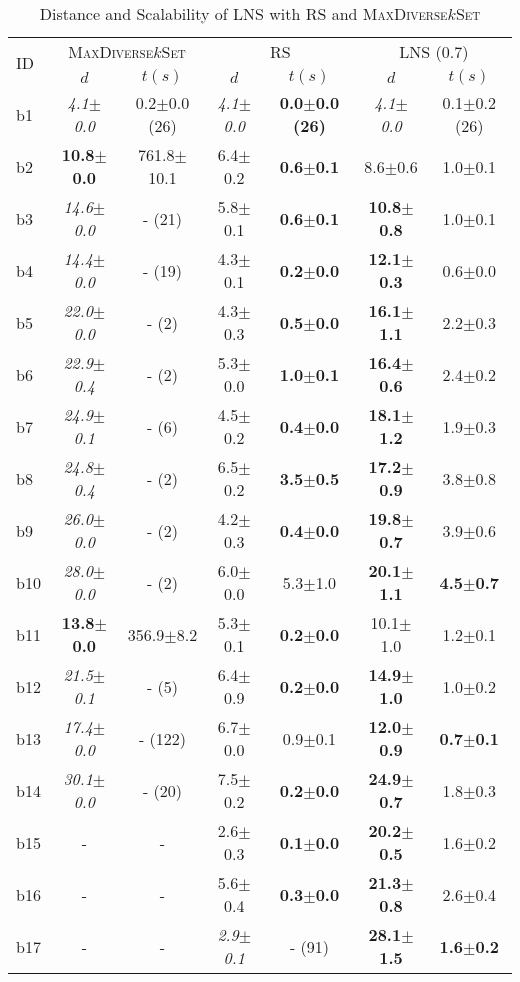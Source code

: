 \begin{longtable}{|l|c|c|c|c|c|c|}
\caption{\label{tab:dist_max_rs_lns} Distance and Scalability of \ac{LNS} with \ac{RS} and \textsc{MaxDiverse$k$Set}}\\
\hline
\multirow{2}{*}{ID}&\multicolumn{2}{c|}{\textsc{MaxDiverse$k$Set}}&\multicolumn{2}{c|}{{RS}}&\multicolumn{2}{c|}{LNS (0.7)}\\
\cline{2-7}
&$d$&$t(s)$&$d$&$t(s)$&$d$&$t(s)$\\
\hline
b1&\textit{4.1$\pm$0.0} & 0.2$\pm$0.0 (26)&\textit{4.1$\pm$0.0} & \textbf{0.0$\pm$0.0 (26)}&\textit{4.1$\pm$0.0} & 0.1$\pm$0.2 (26)
\\
b2&\textbf{10.8$\pm$0.0} & 761.8$\pm$10.1&6.4$\pm$0.2 & \textbf{0.6$\pm$0.1}&8.6$\pm$0.6 & 1.0$\pm$0.1
\\
b3&\textit{14.6$\pm$0.0} & - (21)&5.8$\pm$0.1 & \textbf{0.6$\pm$0.1}&\textbf{10.8$\pm$0.8} & 1.0$\pm$0.1
\\
b4&\textit{14.4$\pm$0.0} & - (19)&4.3$\pm$0.1 & \textbf{0.2$\pm$0.0}&\textbf{12.1$\pm$0.3} & 0.6$\pm$0.0
\\
b5&\textit{22.0$\pm$0.0} & - (2)&4.3$\pm$0.3 & \textbf{0.5$\pm$0.0}&\textbf{16.1$\pm$1.1} & 2.2$\pm$0.3
\\
b6&\textit{22.9$\pm$0.4} & - (2)&5.3$\pm$0.0 & \textbf{1.0$\pm$0.1}&\textbf{16.4$\pm$0.6} & 2.4$\pm$0.2
\\
b7&\textit{24.9$\pm$0.1} & - (6)&4.5$\pm$0.2 & \textbf{0.4$\pm$0.0}&\textbf{18.1$\pm$1.2} & 1.9$\pm$0.3
\\
b8&\textit{24.8$\pm$0.4} & - (2)&6.5$\pm$0.2 & \textbf{3.5$\pm$0.5}&\textbf{17.2$\pm$0.9} & 3.8$\pm$0.8
\\
b9&\textit{26.0$\pm$0.0} & - (2)&4.2$\pm$0.3 & \textbf{0.4$\pm$0.0}&\textbf{19.8$\pm$0.7} & 3.9$\pm$0.6
\\
b10&\textit{28.0$\pm$0.0} & - (2)&6.0$\pm$0.0 & 5.3$\pm$1.0&\textbf{20.1$\pm$1.1} & \textbf{4.5$\pm$0.7}
\\
b11&\textbf{13.8$\pm$0.0} & 356.9$\pm$8.2&5.3$\pm$0.1 & \textbf{0.2$\pm$0.0}&10.1$\pm$1.0 & 1.2$\pm$0.1
\\
b12&\textit{21.5$\pm$0.1} & - (5)&6.4$\pm$0.9 & \textbf{0.2$\pm$0.0}&\textbf{14.9$\pm$1.0} & 1.0$\pm$0.2
\\
b13&\textit{17.4$\pm$0.0} & - (122)&6.7$\pm$0.0 & 0.9$\pm$0.1&\textbf{12.0$\pm$0.9} & \textbf{0.7$\pm$0.1}
\\
b14&\textit{30.1$\pm$0.0} & - (20)&7.5$\pm$0.2 & \textbf{0.2$\pm$0.0}&\textbf{24.9$\pm$0.7} & 1.8$\pm$0.3
\\
b15&- & -&2.6$\pm$0.3 & \textbf{0.1$\pm$0.0}&\textbf{20.2$\pm$0.5} & 1.6$\pm$0.2
\\
b16&- & -&5.6$\pm$0.4 & \textbf{0.3$\pm$0.0}&\textbf{21.3$\pm$0.8} & 2.6$\pm$0.4
\\
b17&- & -&\textit{2.9$\pm$0.1} & - (91)&\textbf{28.1$\pm$1.5} & \textbf{1.6$\pm$0.2}
\\
\hline
\end{longtable}
